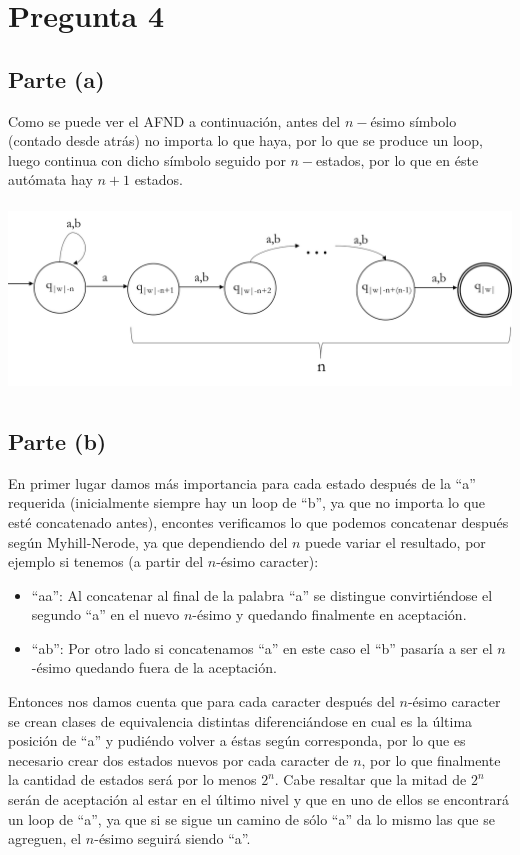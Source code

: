 \documentclass[11pt,letterpaper]{article}
\begin{document}
\section{Pregunta 4}
\subsection{Parte (a)}
Como se puede ver el AFND a continuación, antes del $n-$ésimo símbolo (contado desde atrás) no importa lo que haya, por lo que se produce un loop, luego continua con dicho símbolo seguido por $n-$estados, por lo que en éste autómata hay $n+1$ estados.

\includegraphics[height=5cm]{tarea_4-a.png}
\subsection{Parte (b)}
En primer lugar damos más importancia para cada estado después de la ``a'' requerida (inicialmente siempre hay un loop de ``b'', ya que no importa lo que esté concatenado antes), encontes verificamos lo que podemos concatenar después según Myhill-Nerode, ya que dependiendo del $n$ puede variar el resultado, por ejemplo si tenemos (a partir del $n$-ésimo caracter):
\begin{itemize}
\item{``aa'': Al concatenar al final de la palabra ``a'' se distingue convirtiéndose el segundo ``a'' en el nuevo $n$-ésimo y quedando finalmente en aceptación.}
\item{``ab'': Por otro lado si concatenamos ``a'' en este caso el ``b'' pasaría a ser el $n$-ésimo quedando fuera de la aceptación.}
\end{itemize}
Entonces nos damos cuenta que para cada caracter después del $n$-ésimo caracter se crean clases de equivalencia distintas diferenciándose en cual es la última posición de ``a'' y pudiéndo volver a éstas según corresponda, por lo que es necesario crear dos estados nuevos por cada caracter de $n$, por lo que finalmente la cantidad de estados será por lo menos $2^n$. Cabe resaltar que la mitad de $2^n$ serán de aceptación al estar en el último nivel y que en uno de ellos se encontrará un loop de ``a'', ya que si se sigue un camino de sólo ``a'' da lo mismo las que se agreguen, el $n$-ésimo seguirá siendo ``a''. \\
\end{document}

